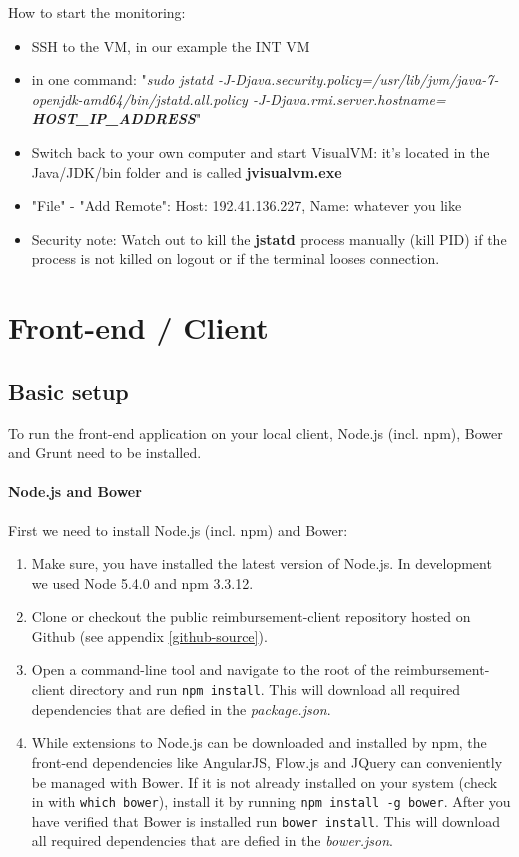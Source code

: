 How to start the monitoring:
\begin{itemize}
	\item SSH to the VM, in our example the INT VM
	\item in one command: "\textit{sudo jstatd -J-Djava.security.policy=/usr/lib/jvm/java-7-openjdk-amd64/bin/jstatd.all.policy -J-Djava.rmi.server.hostname= \textbf{HOST\_IP\_ADDRESS}}"
	\item Switch back to your own computer and start VisualVM: it’s located in the Java/JDK/bin folder and is called \textbf{jvisualvm.exe}
	\item "File" - "Add Remote": Host: 192.41.136.227, Name: whatever you like
	\item Security note: Watch out to kill the \textbf{jstatd} process manually (kill PID) if the process is not killed on logout or if the terminal looses connection.
\end{itemize}


\section{Front-end / Client}

\subsection{Basic setup}
To run the front-end application on your local client, Node.js (incl. npm), Bower and Grunt need to be installed.

\paragraph{Node.js and Bower}
First we need to install Node.js (incl. npm) and Bower:
\begin{enumerate}
  \item Make sure, you have installed the latest version of Node.js. In development we used Node 5.4.0 and npm 3.3.12.
  \item Clone or checkout the public reimbursement-client repository hosted on Github (see appendix \ref{github-source}).
  \item Open a command-line tool and navigate to the root of the reimbursement-client directory and run \texttt{npm install}. This will download all required dependencies that are defied in the \textit{package.json}.
  \item While extensions to Node.js can be downloaded and installed by npm, the front-end dependencies like AngularJS, Flow.js and JQuery can conveniently be managed with Bower. If it is not already installed on your system (check in with \texttt{which bower}), install it by running \texttt{npm install -g bower}. After you have verified that Bower is installed run \texttt{bower install}. This will download all required dependencies that are defied in the \textit{bower.json}.
\end{enumerate}

